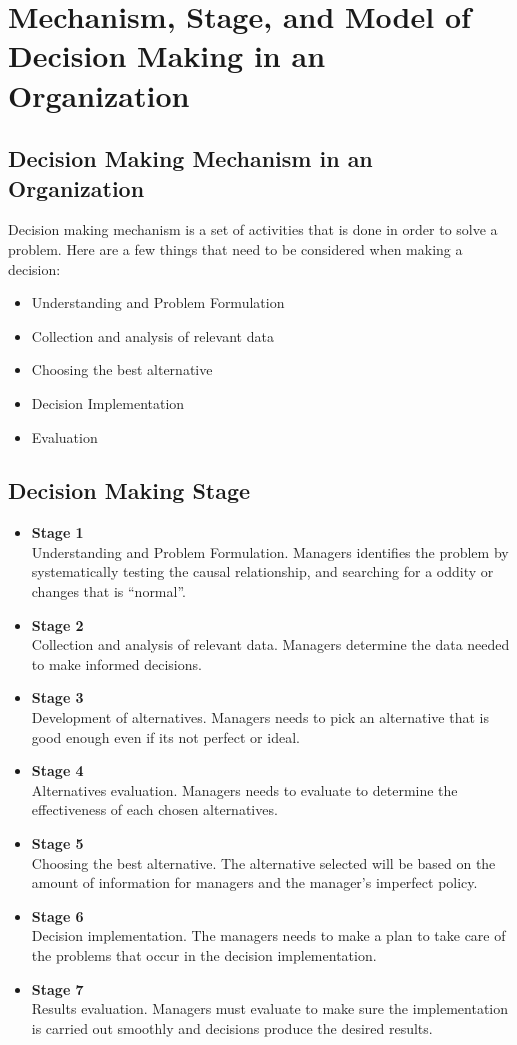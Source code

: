 \documentclass[12pt,titlepage]{article}
\begin{document}
\section{Mechanism, Stage, and Model of Decision Making in an Organization}
\subsection{Decision Making Mechanism in an Organization}
Decision making mechanism is a set of activities that is done in order to solve a
problem. Here are a few things that need to be considered when making a
decision:
\begin{itemize}
    \item Understanding and Problem Formulation
    \item Collection and analysis of relevant data
    \item Choosing the best alternative
    \item Decision Implementation
    \item Evaluation
\end{itemize}
\subsection{Decision Making Stage}
\begin{itemize}
    \item \textbf{Stage 1}\\
    Understanding and Problem Formulation. Managers identifies the problem by systematically testing the causal relationship, and searching for a oddity or changes that is “normal”.
    \item \textbf{Stage 2}\\
    Collection and analysis of relevant data. Managers determine the data needed to make informed decisions.
    \item \textbf{Stage 3}\\
    Development of alternatives. Managers needs to pick an alternative that is good enough even if its not perfect or ideal.
    \item \textbf{Stage 4}\\
    Alternatives evaluation. Managers needs to evaluate to determine the effectiveness of each chosen alternatives.
    \item \textbf{Stage 5}\\
    Choosing the best alternative. The alternative selected will be based on the amount of information for managers and the manager’s imperfect policy.
    \item \textbf{Stage 6}\\
    Decision implementation. The managers needs to make a plan to take care of the problems that occur in the decision implementation.
    \item \textbf{Stage 7}\\
    Results evaluation. Managers must evaluate to make sure the implementation is carried out smoothly and decisions produce the desired results.
\end{itemize}
\end{document}
